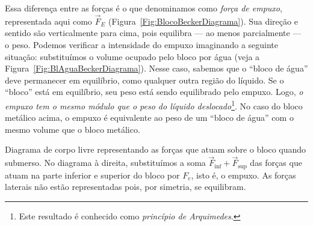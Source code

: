 Essa diferença entre as forças é o que denominamos como \emph{força de empuxo}, representada aqui como $\vec{F}_E$ (Figura~\ref{Fig:BlocoBeckerDiagrama}). Sua direção e sentido são verticalmente para cima, pois equilibra --- ao menos parcialmente --- o peso. Podemos verificar a intensidade do empuxo  imaginando a seguinte situação: substituímos o volume ocupado pelo bloco por água (veja a Figura~\ref{Fig:BlAguaBeckerDiagrama}). Nesse caso, sabemos que o ``bloco de água'' deve permanecer em equilíbrio, como qualquer outra região do líquido. Se o ``bloco'' está em equilíbrio, seu peso está sendo equilibrado pelo empuxo. Logo, \emph{o empuxo tem o mesmo módulo que o peso do líquido deslocado}\footnote{Este resultado é conhecido como \emph{princípio de Arquimedes}.}. No caso do bloco metálico acima, o empuxo é equivalente ao peso de um ``bloco de água'' com o mesmo volume que o bloco metálico.

\begin{marginfigure}
\centering
{}
\caption{Diagrama de corpo livre representando as forças que atuam sobre o bloco quando submerso. No diagrama à direita, substituímos a soma $\vec{F}_{\textrm{inf}} + \vec{F}_{\textrm{sup}}$ das forças que atuam na parte inferior e superior do bloco por $F_e$, isto é, o empuxo. As forças laterais não estão representadas pois, por simetria, se equilibram.}
\label{Fig:BlocoBeckerDiagrama}
\end{marginfigure}


